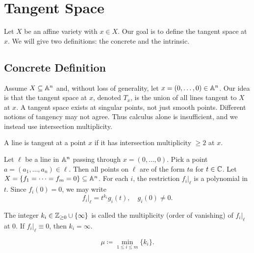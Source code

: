 
\section{Tangent Space}

Let $X$ be an affine variety with $x \in X$.
Our goal is to define the tangent space at $x$.
We will give two definitions: the concrete and the intrinsic.

\subsection{Concrete Definition}

Assume $X \subseteq \aa^n$ and, without loss of generality, let $x = (0,\ldots,0) \in \aa^n$.
Our idea is that the tangent space at $x$, denoted $T_x$, is the union of all lines tangent to $X$ at $x$.
A tangent space exists at singular points, not just smooth points.
Different notions of tangency may not agree.
Thus calculus alone is insufficient, and we instead use intersection multiplicity.

\begin{definition}
    A line is tangent at a point $x$ if it has intersection multiplicity $\geq 2$ at $x$.
\end{definition}

\begin{proposition*}{
    Let $\ell$ be a line in $\aa^n$ passing through $x = (0,\ldots,0)$.
    Pick a point $a = (a_1,\ldots,a_n) \in \ell$.
    Then all points on $\ell$ are of the form $ta$ for $t \in \c$.
    Let $X = \{f_1 = \cdots = f_m = 0\} \subseteq \aa^n$.
    For each $i$, the restriction $f_i|_\ell$ is a polynomial in $t$.
    Since $f_i(0) = 0$, we may write
    \[
        f_i|_\ell = t^{k_i} g_i(t), \quad g_i(0) \neq 0.
    \]
}
\end{proposition*}

\begin{definition}
    The integer $k_i \in \z_{\ge 0} \cup \{\infty\}$ is called the multiplicity (order of vanishing) of $f_i|_\ell$ at $0$.
    If $f_i|_\ell \equiv 0$, then $k_i = \infty$.
\end{definition}

\begin{definition}
    \[
        \mu \coloneqq \min_{1 \le i \le m} \{k_i\}.
    \]
\end{definition}

